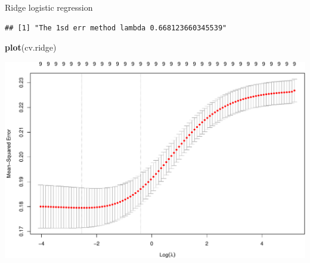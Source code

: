 \documentclass[
  ignorenonframetext,
]{beamer}
\newenvironment{Shaded}{\begin{snugshade}}{\end{snugshade}}
\newcommand{\CommentTok}[1]{\textcolor[rgb]{0.56,0.35,0.01}{\textit{#1}}}
\newcommand{\DataTypeTok}[1]{\textcolor[rgb]{0.13,0.29,0.53}{#1}}
\newcommand{\FloatTok}[1]{\textcolor[rgb]{0.00,0.00,0.81}{#1}}
\newcommand{\KeywordTok}[1]{\textcolor[rgb]{0.13,0.29,0.53}{\textbf{#1}}}
\newcommand{\NormalTok}[1]{#1}
\newcommand{\OperatorTok}[1]{\textcolor[rgb]{0.81,0.36,0.00}{\textbf{#1}}}
\newcommand{\OtherTok}[1]{\textcolor[rgb]{0.56,0.35,0.01}{#1}}
\newcommand{\StringTok}[1]{\textcolor[rgb]{0.31,0.60,0.02}{#1}}
\begin{document}
\begin{frame}[fragile]
\begin{block}{Ridge logistic regression}
\begin{Shaded}
\end{Shaded}

\begin{verbatim}
## [1] "The 1sd err method lambda 0.668123660345539"
\end{verbatim}

\begin{Shaded}
\begin{Highlighting}[]
\KeywordTok{plot}\NormalTok{(cv.ridge)}
\end{Highlighting}
\end{Shaded}

\includegraphics{L3_files/figure-beamer/unnamed-chunk-7-2.pdf}

\begin{Shaded}
\end{Shaded}


\end{block}
\end{frame}
\end{document}
